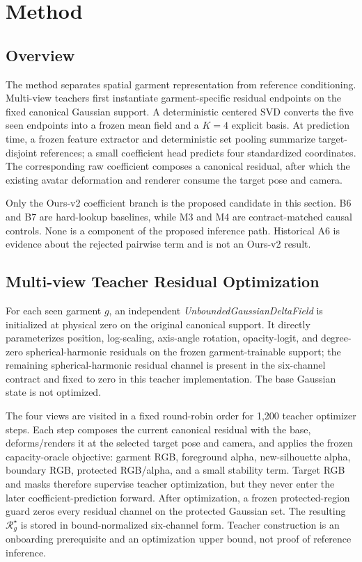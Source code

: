 \section{Method}

\subsection{Overview}

The method separates spatial garment representation from reference conditioning. Multi-view teachers first instantiate garment-specific residual endpoints on the fixed canonical Gaussian support. A deterministic centered SVD converts the five seen endpoints into a frozen mean field and a $K=4$ explicit basis. At prediction time, a frozen feature extractor and deterministic set pooling summarize target-disjoint references; a small coefficient head predicts four standardized coordinates. The corresponding raw coefficient composes a canonical residual, after which the existing avatar deformation and renderer consume the target pose and camera.

Only the Ours-v2 coefficient branch is the proposed candidate in this section. B6 and B7 are hard-lookup baselines, while M3 and M4 are contract-matched causal controls. None is a component of the proposed inference path. Historical A6 is evidence about the rejected pairwise term and is not an Ours-v2 result.

\subsection{Multi-view Teacher Residual Optimization}

For each seen garment $g$, an independent \emph{UnboundedGaussianDeltaField} is initialized at physical zero on the original canonical support. It directly parameterizes position, log-scaling, axis-angle rotation, opacity-logit, and degree-zero spherical-harmonic residuals on the frozen garment-trainable support; the remaining spherical-harmonic residual channel is present in the six-channel contract and fixed to zero in this teacher implementation. The base Gaussian state is not optimized.

The four views are visited in a fixed round-robin order for 1,200 teacher optimizer steps. Each step composes the current canonical residual with the base, deforms/renders it at the selected target pose and camera, and applies the frozen capacity-oracle objective: garment RGB, foreground alpha, new-silhouette alpha, boundary RGB, protected RGB/alpha, and a small stability term. Target RGB and masks therefore supervise teacher optimization, but they never enter the later coefficient-prediction forward. After optimization, a frozen protected-region guard zeros every residual channel on the protected Gaussian set. The resulting $\mathcal{R}_g^{\star}$ is stored in bound-normalized six-channel form. Teacher construction is an onboarding prerequisite and an optimization upper bound, not proof of reference inference.

